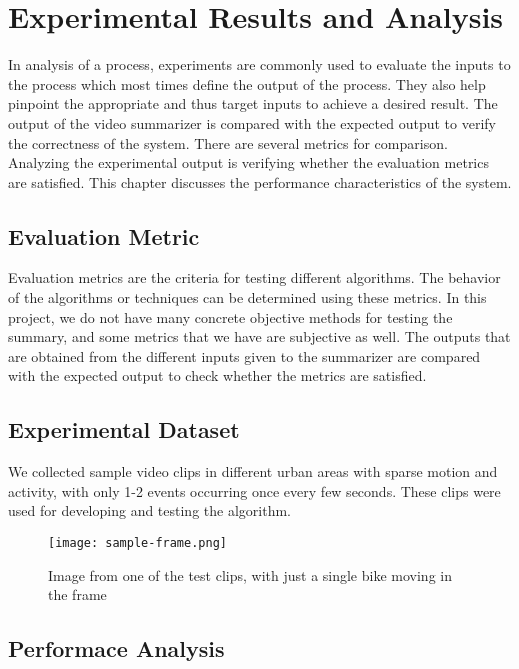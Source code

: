 \chapter{Experimental Results and Analysis}

In analysis of a process, experiments are commonly used to evaluate the inputs to the process which most times define the output of the process. They also help pinpoint the appropriate and thus target inputs to achieve a desired result. The output of the video summarizer is compared with the expected output to verify the correctness of the system. There are several metrics for comparison. Analyzing the experimental output is verifying whether the evaluation metrics are satisfied. This chapter discusses the performance characteristics of the system.

\section{Evaluation Metric}

Evaluation metrics are the criteria for testing different algorithms. The behavior of the algorithms or techniques can be determined using these metrics. In this project, we do not have many concrete objective methods for testing the summary, and some metrics that we have are subjective as well. The outputs that are obtained from the different inputs given to the summarizer are compared with the expected output to check whether the metrics are satisfied.

\section{Experimental Dataset}

We collected sample video clips in different urban areas with sparse motion and activity, with only 1-2 events occurring once every few seconds. These clips were used for developing and testing the algorithm.

\begin{figure}[H]
    \centering
    \texttt{[image: sample-frame.png]}
    \caption{Image from one of the test clips, with just a single bike moving in the frame}
    \label{img:sample-frame}
\end{figure}

\section{Performace Analysis}


